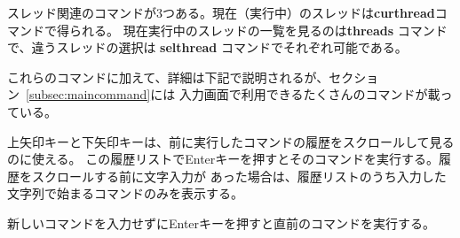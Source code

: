 \documentclass[\pformat,12pt]{jarticle}
\newcommand{\guicmd}[1]{{\gt #1}}
\begin{document}
スレッド関連のコマンドが3つある。現在（実行中）のスレッドは\textbf{curthread}コマンドで得られる。
現在実行中のスレッドの一覧を見るのは\textbf{threads} コマンドで、違うスレッドの選択は
\textbf{selthread} コマンドでそれぞれ可能である。



これらのコマンドに加えて、詳細は下記で説明されるが、セクション~\ref{subsec:maincommand}には
\guicmd{入力}画面で利用できるたくさんのコマンドが載っている。

上矢印キーと下矢印キーは、前に実行したコマンドの履歴をスクロールして見るのに使える。
この履歴リストでEnterキーを押すとそのコマンドを実行する。履歴をスクロールする前に文字入力が
あった場合は、履歴リストのうち入力した文字列で始まるコマンドのみを表示する。

新しいコマンドを入力せずにEnterキーを押すと直前のコマンドを実行する。
\end{document}
